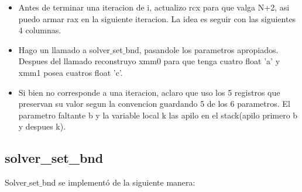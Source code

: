 \begin{itemize}
\item Antes de terminar una iteracion de i, actualizo rcx para que valga N+2, asi puedo armar rax en la siguiente iteracion. La idea es seguir con las siguientes 4 columnas.
\item Hago un llamado a solver$\_$set$\_$bnd, pasandole los parametros apropiados. Despues del llamado reconstruyo xmm0 para que tenga cuatro float 'a' y xmm1 posea cuatros float 'c'.
\item Si bien no corresponde a una iteracion, aclaro que uso los 5 registros que preservan su valor segun la convencion guardando 5 de los 6 parametros. El parametro faltante b y la variable local k las apilo en el stack(apilo primero b y despues k).
\end{itemize}

\subsection{solver\_set\_bnd}
Solver$\_$set$\_$bnd se implementó de la siguiente manera:
